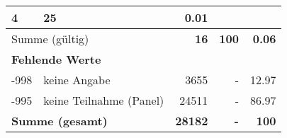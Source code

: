 \begin{longtable}{lXrrr}
       \num{4} &
       \num[round-mode=places,round-precision=2]{25} &
         \num[round-mode=places,round-precision=2]{0,01} \\
     \midrule
     \multicolumn{2}{l}{Summe (gültig)} &
       \textbf{\num{16}} &
     \textbf{100} &
       \textbf{\num[round-mode=places,round-precision=2]{0,06}} \\
     \multicolumn{5}{l}{\textbf{Fehlende Werte}}\\
       -998 &
       keine Angabe &
         \num{3655} &
        - &
         \num[round-mode=places,round-precision=2]{12,97} \\
       -995 &
       keine Teilnahme (Panel) &
         \num{24511} &
        - &
         \num[round-mode=places,round-precision=2]{86,97} \\
     \midrule
     \multicolumn{2}{l}{\textbf{Summe (gesamt)}} &
          \textbf{\num{28182}} &
        \textbf{-} &
        \textbf{100} \\
     \bottomrule
     \end{longtable}
     

